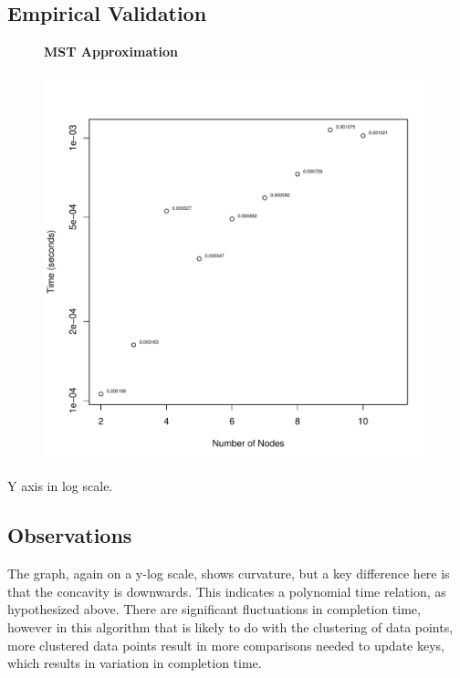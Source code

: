 \documentclass[a4paper,12pt]{article}
\begin{document}
\subsection{Empirical Validation}
\begin{figure}[H]
  \centering
  \textbf{MST Approximation}\par\medskip
  \includegraphics[width=1\linewidth]{MSTApproximation.pdf}
\end{figure}
Y axis in log scale.
\subsection{Observations}
The graph, again on a y-log scale, shows curvature, but a key difference here is that the concavity is downwards. This indicates a polynomial time relation, as hypothesized above. There are significant fluctuations in completion time, however in this algorithm that is likely to do with the clustering of data points, more clustered data points result in more comparisons needed to update keys, which results in variation in completion time.
\end{document}
